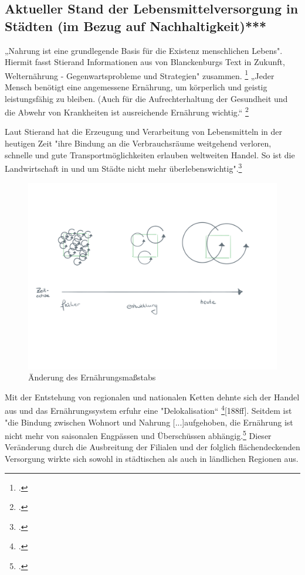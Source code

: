 \documentclass{scrartcl}
\begin{document}
\subsection{Aktueller Stand der Lebensmittelversorgung in Städten (im Bezug auf Nachhaltigkeit)***} 

„Nahrung ist eine grundlegende Basis für die Existenz menschlichen Lebens". Hiermit fasst Stierand Informationen aus von Blanckenburgs Text in Zukunft, Welternährung - Gegenwartsprobleme und Strategien" zusammen. \footcite[S.122f]{Stierand2008StadtLebensmittel} „Jeder Mensch benötigt eine angemessene Ernährung, um körperlich und geistig leistungsfähig zu bleiben. (Auch für die Aufrechterhaltung der Gesundheit und die Abwehr von Krankheiten ist ausreichende Ernährung wichtig.“ \footcite{Blanckenburg1987ZukunftDie}

Laut Stierand hat die Erzeugung und Verarbeitung von Lebensmitteln in der heutigen Zeit "ihre Bindung an die Verbrauchsräume weitgehend verloren, schnelle und gute Transportmöglichkeiten erlauben weltweiten Handel. So ist die Landwirtschaft in und um Städte nicht mehr überlebenswichtig".\footcite[S.122f]{Stierand2008StadtLebensmittel} 

\begin{figure}[htbp]
\centering
\includegraphics[width=12cm]{image_folder/ernahrung.png}
\caption{Änderung des Ernährungsmaßstabs}
\label{fig:massstab}
\end{figure}

Mit der Entstehung von regionalen und nationalen Ketten dehnte sich der Handel aus und das Ernährungssystem erfuhr eine "Delokalisation“ \footcite{MASSIMOMONTANARI1993DerEuropa}[188ff]. Seitdem ist "die Bindung zwischen Wohnort und Nahrung [...]aufgehoben, die Ernährung ist nicht mehr von saisonalen Engpässen und Überschüssen abhängig.\footcite{Stierand2008StadtLebensmittel, S.122f} Dieser Veränderung durch die Ausbreitung der Filialen und der folglich flächendeckenden Versorgung wirkte sich sowohl in städtischen als auch in ländlichen Regionen aus. 
\end{document}

